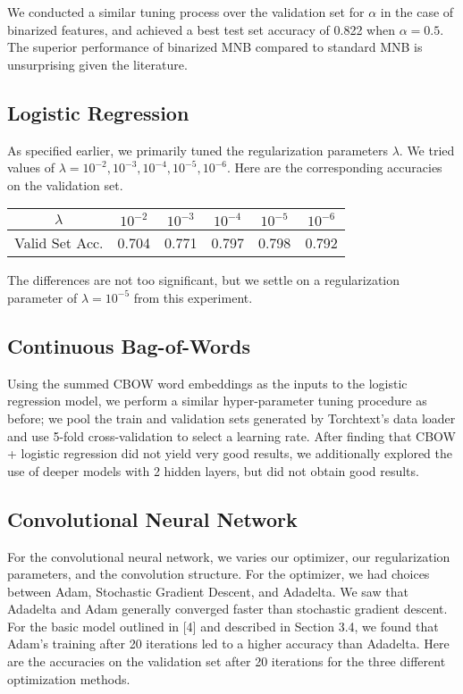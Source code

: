 \documentclass[11pt]{article}
\begin{document}
We conducted a similar tuning process over the validation set for $\alpha$ in the case of binarized features, and achieved a best test set accuracy of 0.822 when $\alpha = 0.5$. The superior performance of binarized MNB compared to standard MNB is unsurprising given the literature.

\subsection{Logistic Regression}

As specified earlier, we primarily tuned the regularization parameters $\lambda$.  We tried values of $\lambda = 10^{-2}, 10^{-3}, 10^{-4}, 10^{-5}, 10^{-6}$.  Here are the corresponding accuracies on the validation set.

\begin{center}
\begin{tabular}{ c | c c c c c}
$\lambda$ & $10^{-2}$ & $10^{-3}$ & $10^{-4}$ & $10^{-5}$ & $10^{-6}$ \\
\hline
Valid Set Acc. & 0.704 & 0.771 & 0.797 & 0.798 & 0.792 
\end{tabular}
\end{center}
The differences are not too significant, but we settle on a regularization parameter of $\lambda = 10^{-5}$ from this experiment.  

\subsection{Continuous Bag-of-Words}
Using the summed CBOW word embeddings as the inputs to the logistic regression model, we perform a similar hyper-parameter tuning procedure as before; we pool the train and validation sets generated by Torchtext's data loader and use 5-fold cross-validation to select a learning rate. After finding that CBOW + logistic regression did not yield very good results, we additionally explored the use of deeper models with 2 hidden layers, but did not obtain good results.

\subsection{Convolutional Neural Network}

For the convolutional neural network, we varies our optimizer, our regularization parameters, and the convolution structure.  For the optimizer, we had choices between Adam, Stochastic Gradient Descent, and Adadelta.  We saw that Adadelta and Adam generally converged faster than stochastic gradient descent.  For the basic model outlined in [4] and described in Section 3.4, we found that Adam's training after 20 iterations led to a higher accuracy than Adadelta.  Here are the accuracies on the validation set after 20 iterations for the three different optimization methods.  
\end{document}
